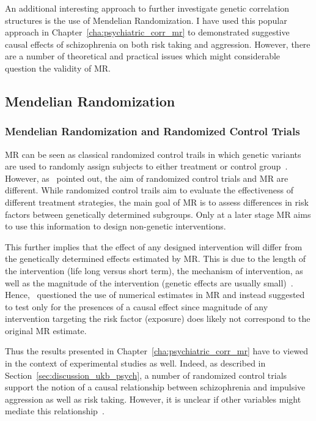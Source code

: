An additional interesting approach to further investigate genetic correlation structures is the use of Mendelian Randomization.
I have used this popular approach in Chapter~\ref{cha:psychiatric_corr_mr} to demonstrated suggestive causal effects of schizophrenia on both risk taking and aggression.
However, there are a number of theoretical and practical issues which might considerable question the validity of MR\@.

\subsection{Mendelian Randomization}
\label{sub:mendelian_randomization_discussion}

\subsubsection{Mendelian Randomization and Randomized Control Trials}
\label{ssub:causality_and_mendelian_randomization}

MR can be seen as classical randomized control trails in which genetic variants are used to randomly assign subjects to either treatment or control group~\cite{Hingorani2005}.
However, as~\citet{Burgess2016a} pointed out, the aim of randomized control trials and MR are different.
While randomized control trails aim to evaluate the effectiveness of different treatment strategies, the main goal of MR is to assess differences in risk factors between genetically determined subgroups.   
Only at a later stage MR aims to use this information to design non-genetic interventions.

This further implies that the effect of any designed intervention will differ from the genetically determined effects estimated by MR\@.
This is due to the length of the intervention (life long versus short term), the mechanism of intervention, as well as the magnitude of the intervention (genetic effects are usually small)~\cite{Evans2015}. 
Hence,~\citet{Vanderweele2015} questioned the use of  numerical estimates in MR and instead suggested to test only for the presences of a causal effect since magnitude of any intervention targeting the risk factor (exposure) does likely not correspond to the original MR estimate.

Thus the results presented in Chapter~\ref{cha:psychiatric_corr_mr} have to viewed in the context of experimental studies as well.
Indeed, as described in Section~\ref{sec:discussion_ukb_psych}, a number of randomized control trials support the notion of a causal relationship between schizophrenia and impulsive aggression as well as risk taking. 
However, it is unclear if other variables might mediate this relationship~\cite{Evans2015}.

